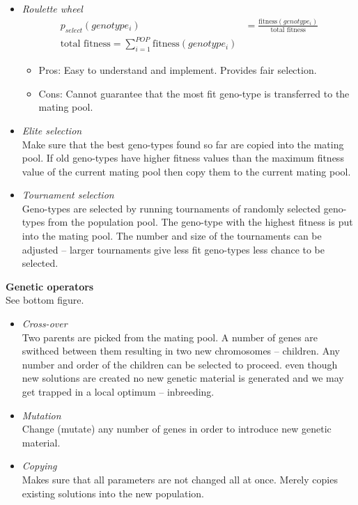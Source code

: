 \documentclass[12pt,a4paper]{report}
\begin{document}
\begin{itemize}
\item \textit{Roulette wheel}\\
\begin{align*}
p_{select}(genotype_i)&=\frac{\text{fitness}(genotype_i)}{\text{total fitness}}\\
\text{total fitness}=\sum_{i=1}^{POP}\text{fitness}(genotype_i)
\end{align*}
\begin{itemize}
\item Pros: Easy to understand and implement. Provides fair selection.
\item Cons: Cannot guarantee that the most fit geno-type is transferred to the mating pool.
\end{itemize}
\item \textit{Elite selection}\\
Make sure that the best geno-types found so far are copied into the mating pool. If old geno-types have higher fitness values than the maximum fitness value of the current mating pool then copy them to the current mating pool.
\item \textit{Tournament selection}\\
Geno-types are selected by running tournaments of randomly selected geno-types from the population pool. The geno-type with the highest fitness is put into the mating pool. The number and size of the tournaments can be adjusted -- larger tournaments give less fit geno-types less chance to be selected.
\end{itemize}
\textbf{Genetic operators}\\
See bottom figure.
\begin{itemize}
\item \textit{Cross-over}\\
Two parents are picked from the mating pool. A number of genes are swithced between them resulting in two new chromosomes -- children. Any number and order of the children can be selected to proceed. even though new solutions are created no new genetic material is generated and we may get trapped in a local optimum -- inbreeding.
\item \textit{Mutation}\\
Change (mutate) any number of genes in order to introduce new genetic material.
\item \textit{Copying}\\
Makes sure that all parameters are not changed all at once. Merely copies existing solutions into the new population.
\end{itemize}
\end{document}
